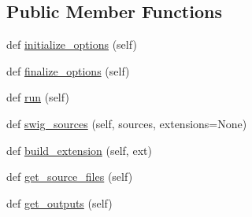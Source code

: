 \subsection*{Public Member Functions}
\begin{DoxyCompactItemize}
\item 
def \hyperlink{classnumpy_1_1distutils_1_1command_1_1build__ext_1_1build__ext_a580b3f365b5546f68d8411a4bab650ba}{initialize\+\_\+options} (self)
\item 
def \hyperlink{classnumpy_1_1distutils_1_1command_1_1build__ext_1_1build__ext_a464122f096fd156ddc0c5ce04c7d925f}{finalize\+\_\+options} (self)
\item 
def \hyperlink{classnumpy_1_1distutils_1_1command_1_1build__ext_1_1build__ext_a702ab3d50fc5d0066b8500f17228d7fb}{run} (self)
\item 
def \hyperlink{classnumpy_1_1distutils_1_1command_1_1build__ext_1_1build__ext_a85ecb50ff3f86f010bfb00b10e4aef06}{swig\+\_\+sources} (self, sources, extensions=None)
\item 
def \hyperlink{classnumpy_1_1distutils_1_1command_1_1build__ext_1_1build__ext_a3f9ab11a7f4d9680a0bdeee0c56815f3}{build\+\_\+extension} (self, ext)
\item 
def \hyperlink{classnumpy_1_1distutils_1_1command_1_1build__ext_1_1build__ext_a23384bfdac8950acfa5df48712f3b779}{get\+\_\+source\+\_\+files} (self)
\item 
def \hyperlink{classnumpy_1_1distutils_1_1command_1_1build__ext_1_1build__ext_ac6d1ba5c64c9b5137db472a6a157930b}{get\+\_\+outputs} (self)
\end{DoxyCompactItemize}
